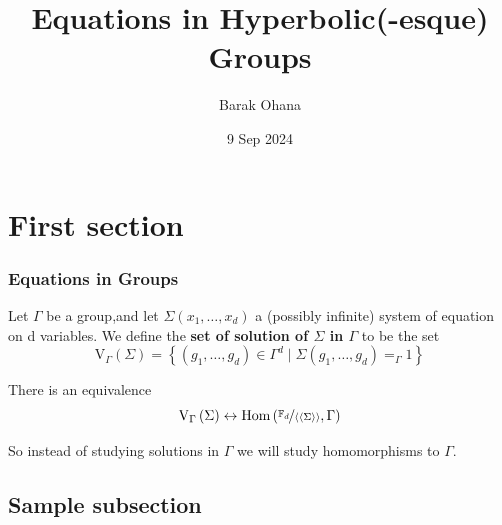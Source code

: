 \documentclass[handout]{beamer}[10]
\title{Equations in Hyperbolic(-esque) Groups}
\author{Barak Ohana}
\institute{The Hebrew University of Jerusalem}
\date{9 Sep 2024}
\newcommand{\sol}{\text{V}_{\Gamma}}
\renewcommand{\hom}{\text{Hom}}
\begin{document}
\begin{frame}\titlepage \vspace{-0.5cm}\end{frame}


\section{First section}

\begin{frame}
    \frametitle{Equations in Groups}
    \pause
    Let $\Gamma$  be a group,\pause and let $\Sigma\left(x_{1},\ldots,x_{d}\right)$ a (possibly infinite) system of equation on d variables. \pause
    We define the \textbf{set of solution of $\Sigma$ in $\Gamma$} to be the set
    \begin{equation*}
        \sol\left(\Sigma\right)=\left\{ \left(g_{1},\ldots,g_{d}\right)\in\Gamma^{d}\mid\Sigma\left(g_{1},\ldots,g_{d}\right)=_{\Gamma}1\right\} 
    \end{equation*}

            \pause

    There is an equivalence
    \begin{equation*}
        \sol\rb{\Sigma} \leftrightarrow \hom\rb{\nicefrac{\ff_d}{\ab{\ab{\Sigma}}}, \Gamma}
    \end{equation*}

    \pause

    So instead of studying solutions in $\Gamma$ we will study homomorphisms to $\Gamma$.

\end{frame}


\subsection{Sample subsection}
\end{document}
